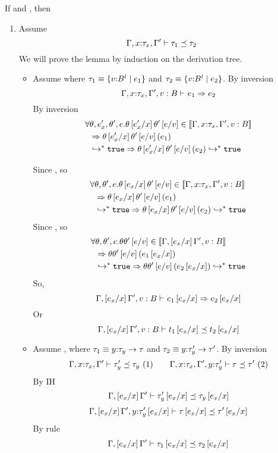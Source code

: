 \newcommand\generalconditionImpol[2]{\ensuremath{\evals{#1}{\etrue}\Rightarrow \evals{#2}{\etrue}}}
If  and , then 
\begin{enumerate}
\item\label{proof:sub:sub} Assume
	$$\issubtype{\Gamma, x\colon\tau_x, \Gamma'}{\tau_1}{\tau_2}$$
We will prove the lemma by induction on the derivation tree.
\begin{itemize}
\item \rsubbase
Assume 
where $\tau_1 \equiv \tref{v}{B}{l}{e_1}$
and   $\tau_2 \equiv \tref{v}{B}{l}{e_2}$.
By inversion
	$$
	\issubref{\Gamma, x\colon\tau_x, \Gamma',v:B}{e_1}{e_2}
	$$
By inversion
	\begin{align*}
	\forall &\theta, e'_x, \theta',e .
	\iswellformedtheta{\Gamma, x\colon\tau_x, \Gamma',v:B}
		{\theta\sub{x}{e'_x}\theta'\sub{v}{e}}\\& \Rightarrow
	\generalconditionImpl{\thetasub{\theta\sub{x}{e'_x}\theta'\sub{v}{e}}{e_1}\\&}
						 {\thetasub{\theta\sub{x}{e'_x}\theta'\sub{v}{e}}{e_2}}
	\end{align*}

Since , so
	\begin{align*}
	\forall &\theta, \theta',e .
	\iswellformedtheta{\Gamma,x\colon\tau_x, \Gamma',v:B}{\theta \sub{x}{e_x}\theta'\sub{v}{e}}\\& \Rightarrow
	\generalconditionImpl{\thetasub{\theta\sub{x}{e_x}\theta'\sub{v}{e}}{e_1}\\&}
						 {\thetasub{\theta\sub{x}{e_x}\theta'\sub{v}{e}}{e_2}}
	\end{align*}
Since , so
	\begin{align*}
	\forall &\theta, \theta',e .
	\iswellformedtheta{\Gamma,\sub{x}{e_x}\Gamma',v:B}{\theta\theta'\sub{v}{e}}\\& \Rightarrow
	\generalconditionImpl{\thetasub{\theta\theta'\sub{v}{e}}{e_1\sub{x}{e_x}}\\&}
						 {\thetasub{\theta\theta'\sub{v}{e}}{e_2\sub{x}{e_x}}}
	\end{align*}
So,
	$$
	\issubref{\Gamma, \sub{x}{e_x}\Gamma',v:B}{e_1\sub{x}{e_x}}{e_2\sub{x}{e_x}}
	$$
Or
	$$
	\issubtype{\Gamma, \sub{x}{e_x}\Gamma',v:B}{t_1\sub{x}{e_x}}{t_2\sub{x}{e_x}}
	$$
\item \rsubfun
Assume ,
where $\tau_1 \equiv \tfun{y}{\tau_y}{\tau}$
and   $\tau_2 \equiv \tfun{y}{\tau'_y}{\tau'}$.
By inversion
	$$
	\issubtype{\Gamma, x\colon\tau_x, \Gamma'}{\tau'_y}{\tau_y}\ (1) \qquad
	\issubtype{\Gamma, x\colon\tau_x, \Gamma',y\colon\tau'_y}{\tau}{\tau'}\ (2)
	$$
By IH	
	$$
	\issubtype{\Gamma, \sub{x}{e_x}\Gamma'}{\tau'_y\sub{x}{e_x}}{\tau_y\sub{x}{e_x}} 
	$$
	$$
	\issubtype{\Gamma, \sub{x}{e_x}\Gamma',y\colon\tau'_y\sub{x}{e_x}}{\tau\sub{x}{e_x}}{\tau'\sub{x}{e_x}}
	$$
By rule \rsubfun	
	$$
	\issubtype{\Gamma, \sub{x}{e_x}\Gamma'}{\tau_1\sub{x}{e_x}}{\tau_2\sub{x}{e_x}}
	$$
\end{itemize}



\end{enumerate}

